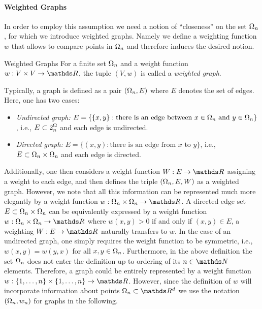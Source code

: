 \paragraph{Weighted Graphs}
In order to employ this assumption we need a notion of \enquote{closeness} on the set $\Omega_n$, for which we introduce weighted graphs. Namely we define a weighting function $w$ that allows to compare points in $\Omega_n$ and therefore induces the desired notion. 
%
\begin{definition}{Weighted Graphs}{}
For a finite set $\Omega_n$ and a weight function $w:V\times V\to\R$, the tuple $(V,w)$ is called a \emph{weighted graph}.
\end{definition}
%
\begin{remark}{}{}
Typically, a graph is defined as a pair $(\Omega_n,E)$ where $E$ denotes the set of edges. Here, 
one has two cases:
\begin{itemize}
\item \emph{Undirected graph:} $E=\{ \{x,y\}: \text{there is an edge between } x\in \Omega_n \text{ and } y\in \Omega_n\}$, i.e., 
$E\subset 2^\Omega_n$ and each edge is undirected.
%
\item \emph{Directed graph:} $E=\{ (x,y): \text{there is an edge from } x \text{ to } y\}$, i.e.,
$E\subset \Omega_n\times \Omega_n$ and each edge is directed.
%
\end{itemize}
Additionally, one then considers a weight function $W:E\to\R$ assigning a weight to each edge, and then defines 
the triple $(\Omega_n,E,W)$ as a weighted graph. However, we note that all this information can be represented much more elegantly by a weight function $w:\domain_n\times \domain_n\to\R$. A directed edge set $E\subset \Omega_n\times \Omega_n$ can be equivalently expressed by 
a weight function $w:\domain_n\times \domain_n\to\R$ where $w(x,y)>0$ if and only if $(x,y)\in E$, a weighting $W:E\to\R$ 
naturally transfers to $w$. In the case of an undirected graph, one simply requires the weight function to be symmetric, i.e., 
$w(x,y)=w(y,x)$ for all $x,y\in \Omega_n$.
%
Furthermore, in the above definition the set $\Omega_n$ does not enter the definition up to ordering of its $n\in \N$  elements. Therefore, a graph could be entirely represented by a weight function $w:\{1,\ldots,n\}\times\{1,\ldots,n\}\to\R$. However, since the definition of $w$ will incorporate information about points $\domain_n\subset\R^d$ we use the notation $(\Omega_n, w_n)$ for graphs in the following.
\end{remark}
%
%
%
